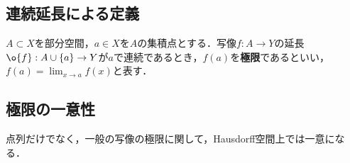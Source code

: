 \documentclass[uplatex,dvipdfmx]{jsreport}
\begin{document}
\subsection{連続延長による定義}

\begin{definition}
    $A\subset X$を部分空間，$a\in X$を$A$の集積点とする．写像$f:A\to Y$の延長$\o{f}:A\cup\{a\}\to Y$が$a$で連続であるとき，$f(a)$を\textbf{極限}であるといい，$f(a)=\lim_{x\to a}f(x)$と表す．
\end{definition}

\subsection{極限の一意性}

\begin{tcolorbox}[colframe=ForestGreen, colback=ForestGreen!10!white,breakable,colbacktitle=ForestGreen!40!white,coltitle=black,fonttitle=\bfseries\sffamily,
title=]
    点列だけでなく，一般の写像の極限に関して，Hausdorff空間上では一意になる．
\end{tcolorbox}
\end{document}

